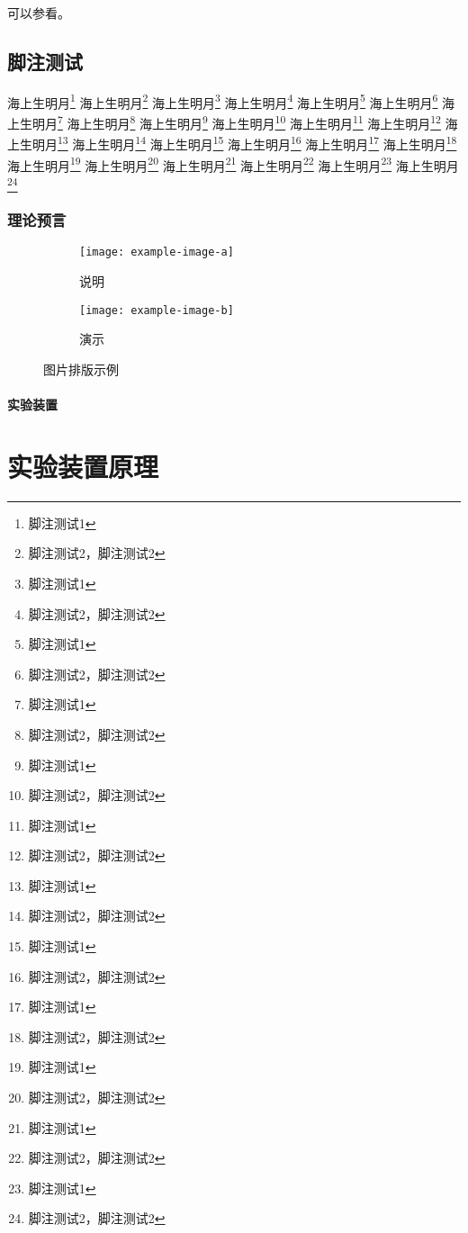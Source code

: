 可以参看\cite{Litvinova:2017jnd,Li:2017kdj}。



\section{脚注测试}%

\zhlipsum[2-3]
海上生明月\footnote{脚注测试1}
海上生明月\footnote{脚注测试2，脚注测试2}
海上生明月\footnote{脚注测试1}
海上生明月\footnote{脚注测试2，脚注测试2}
海上生明月\footnote{脚注测试1}
海上生明月\footnote{脚注测试2，脚注测试2}
海上生明月\footnote{脚注测试1}
海上生明月\footnote{脚注测试2，脚注测试2}
海上生明月\footnote{脚注测试1}
海上生明月\footnote{脚注测试2，脚注测试2}
海上生明月\footnote{脚注测试1}
海上生明月\footnote{脚注测试2，脚注测试2}
海上生明月\footnote{脚注测试1}
海上生明月\footnote{脚注测试2，脚注测试2}
海上生明月\footnote{脚注测试1}
海上生明月\footnote{脚注测试2，脚注测试2}
海上生明月\footnote{脚注测试1}
海上生明月\footnote{脚注测试2，脚注测试2}
海上生明月\footnote{脚注测试1}
海上生明月\footnote{脚注测试2，脚注测试2}
海上生明月\footnote{脚注测试1}
海上生明月\footnote{脚注测试2，脚注测试2}
海上生明月\footnote{脚注测试1}
海上生明月\footnote{脚注测试2，脚注测试2}

\subsection{理论预言}%



\zhlipsum[3]


\begin{figure}[h!]
	\centering
	\begin{subfigure}{0.4\linewidth}
		\centering
		\texttt{[image: example-image-a]}
		\caption{说明}\label{}
	\end{subfigure}
	\hfil
	\begin{subfigure}{0.4\linewidth}
		\centering
		\texttt{[image: example-image-b]}
		\caption{演示}\label{}
	\end{subfigure}
	\caption{图片排版示例}
\end{figure}

\subsubsection{实验装置}%

\zhlipsum[4]


\chapter{实验装置原理}%

